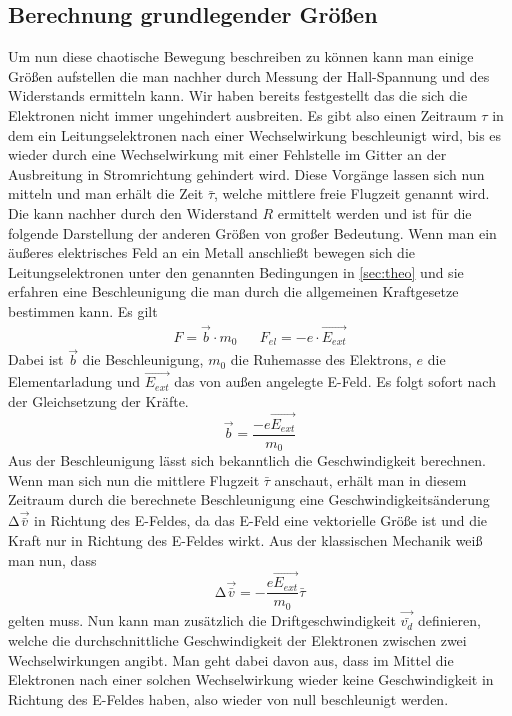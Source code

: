 \subsection{Berechnung grundlegender Größen}
Um nun diese chaotische Bewegung beschreiben zu können kann man einige Größen aufstellen die man nachher durch Messung der Hall-Spannung und des Widerstands ermitteln kann.
Wir haben bereits festgestellt das die sich die Elektronen nicht immer ungehindert ausbreiten. Es gibt also einen Zeitraum $\tau$ in dem ein Leitungselektronen nach einer Wechselwirkung
beschleunigt wird, bis es wieder durch eine Wechselwirkung mit einer Fehlstelle im Gitter an der Ausbreitung in Stromrichtung gehindert wird.
Diese Vorgänge lassen sich nun mitteln und man erhält die Zeit $\bar{\tau}$, welche mittlere freie Flugzeit genannt wird.
Die kann nachher durch den Widerstand $R$ %
ermittelt werden und ist für die folgende Darstellung der anderen Größen von großer Bedeutung.
Wenn man ein äußeres elektrisches Feld an ein Metall anschließt bewegen sich die Leitungselektronen unter den genannten Bedingungen in \ref{sec:theo} und sie erfahren eine Beschleunigung
die man durch die allgemeinen Kraftgesetze bestimmen kann. Es gilt
\begin{align}
\nonumber
F = \vec{b} \cdot m_{0} && F_{el} = -e \cdot \vec{E_{ext}}
\end{align}
Dabei ist $\vec{b}$ die Beschleunigung, $m_{0}$ die Ruhemasse des Elektrons, $e$ die Elementarladung und $\vec{E_{ext}}$ das von außen angelegte E-Feld.
Es folgt sofort nach der Gleichsetzung der Kräfte.
\begin{equation}
\vec{b} = \frac{-e \vec{E_{ext}}}{m_{0}}
\end{equation}
Aus der Beschleunigung lässt sich bekanntlich die Geschwindigkeit berechnen. Wenn man sich nun die mittlere Flugzeit $\bar{\tau}$ anschaut, erhält man in diesem Zeitraum durch die
berechnete Beschleunigung eine Geschwindigkeitsänderung $\increment \vec{\bar{v}}$ in Richtung des E-Feldes, da das E-Feld eine vektorielle Größe ist und die Kraft nur in Richtung des E-Feldes wirkt.
Aus der klassischen Mechanik weiß man nun, dass
\begin{equation}
\label{eqn:deltav}
\increment \vec{\bar{v}} = - \frac{e\vec{E_{ext}}}{m_{0}} \bar{\tau}
\end{equation}
gelten muss. Nun kann man zusätzlich die Driftgeschwindigkeit $\vec{\bar{v_{d}}}$ definieren, welche die durchschnittliche Geschwindigkeit der Elektronen zwischen zwei Wechselwirkungen
angibt. Man geht dabei davon aus, dass im Mittel die Elektronen nach einer solchen Wechselwirkung wieder keine Geschwindigkeit in Richtung des E-Feldes haben, also wieder von null beschleunigt werden.
